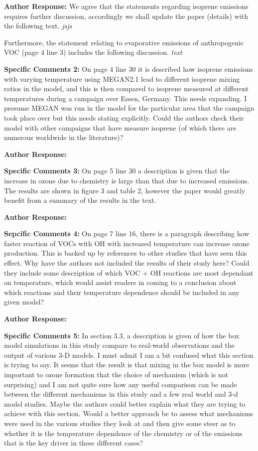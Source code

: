 \documentclass{article}
\begin{document}
\textbf{Author Response:} We agree that the statements regarding isoprene emissions requires further discussion, accordingly we shall update the paper (details) with the following text.
\textit{
    jsjs
}

Furthermore, the statement relating to evaporative emissions of anthropogenic VOC (page 4 line 3) includes the following discussion.
\textit{
    text
}

\textbf{Specific Comments 2:} On page 4 line 30 it is described how isoprene emissions with varying temperature using MEGAN2.1 lead to different isoprene mixing ratios in the model, and this is then compared to isoprene measured at different temperatures during a campaign over Essen, Germany. This needs expanding. I presume MEGAN was run in the model for the particular area that the campaign took place over but this needs stating explicitly.  Could the authors check their model with other campaigns that have measure isoprene (of which there are numerous worldwide in the literature)?

\textbf{Author Response:}

\textbf{Specific Comments 3:} On page 5 line 30 a description is given that the increase in ozone due to chemistry is large than that due to increased emissions. The results are shown in figure 3 and table 2, however the paper would greatly benefit from a summary of the results in the text. 

\textbf{Author Response:}

\textbf{Sepcific Comments 4:} On page 7 line 16, there is a paragraph describing how faster reaction of VOCs with OH with increased temperature can increase ozone production. This is backed up by references to other studies that have seen this effect. Why have the authors not included the results of their study here? Could they include some description of which VOC + OH reactions are most dependant on temperature, which would assist readers in coming to a conclusion about which reactions and their temperature dependence should be included in any given model?

\textbf{Author Response:}

\textbf{Specific Comments 5:} In section 3.3, a description is given of how the box model simulations in this study compare to real-world observations and the output of various 3-D models. I must admit I am a bit confused what this section is trying to say. It seems that the result is that mixing in the box model is more important to ozone formation that the choice of mechanism (which is not surprising) and I am not quite sure how any useful comparison can be made between the different mechanisms in this study and a few real world and 3-d model studies. Maybe the authors could better explain what they are trying to achieve with this section. Would a better approach be to assess what mechanisms were used in the various studies they look at and then give some steer as to whether it is the temperature dependence of the chemistry or of the emissions that is the key driver in these different cases?
\end{document}
